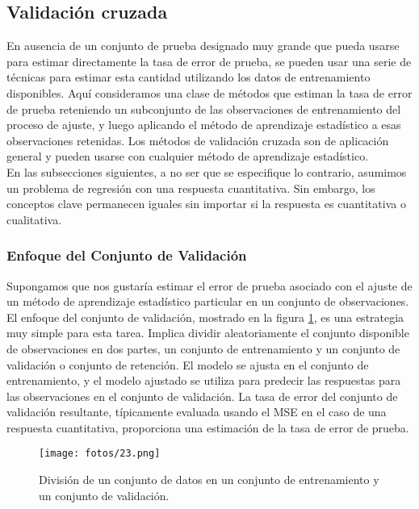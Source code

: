 \subsection{Validación cruzada}

En ausencia de un conjunto de prueba designado muy grande que pueda usarse para estimar directamente la tasa de error de prueba, se pueden usar una serie de técnicas para estimar esta cantidad utilizando los datos de entrenamiento disponibles. Aquí consideramos una clase de métodos que estiman la tasa de error de prueba reteniendo un subconjunto de las observaciones de entrenamiento del proceso de ajuste, y luego aplicando el método de aprendizaje estadístico a esas observaciones retenidas. Los métodos de validación cruzada son de aplicación general y pueden usarse con cualquier método de aprendizaje estadístico. \\

En las subsecciones siguientes, a no ser que se especifique lo contrario, asumimos un problema de regresión con una respuesta cuantitativa. Sin embargo, los conceptos clave permanecen iguales sin importar si la respuesta es cuantitativa o cualitativa.

\subsubsection{Enfoque del Conjunto de Validación}

Supongamos que nos gustaría estimar el error de prueba asociado con el ajuste de un método de aprendizaje estadístico particular en un conjunto de observaciones. El enfoque del conjunto de validación, mostrado en la figura \ref{fig5.1}, es una estrategia muy simple para esta tarea. Implica dividir aleatoriamente el conjunto disponible de observaciones en dos partes, un conjunto de entrenamiento y un conjunto de validación o conjunto de retención. El modelo se ajusta en el conjunto de entrenamiento, y el modelo ajustado se utiliza para predecir las respuestas para las observaciones en el conjunto de validación. La tasa de error del conjunto de validación resultante, típicamente evaluada usando el MSE en el caso de una respuesta cuantitativa, proporciona una estimación de la tasa de error de prueba. \\

\begin{figure}[h]
\centering
\texttt{[image: fotos/23.png]}
\caption{División de un conjunto de datos en un conjunto de entrenamiento y un conjunto de validación.}
\label{fig5.1}
\end{figure}

